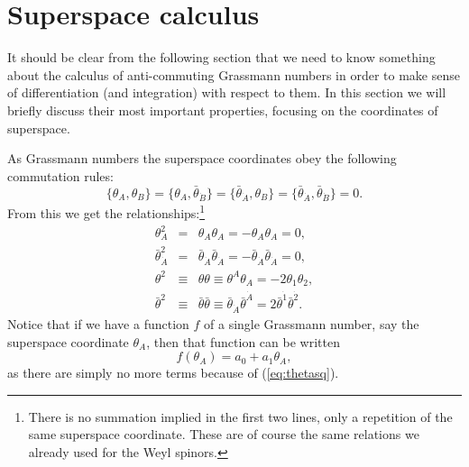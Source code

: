 \documentclass[notes.tex]{subfiles}
\begin{document}
\section{Superspace calculus}
\label{sec:calc}
It should be clear from the following section that we need to know something about the calculus of anti-commuting Grassmann numbers in order to make sense of differentiation (and integration) with respect to them. In this section we will briefly discuss their most important properties, focusing on the coordinates of superspace.

As Grassmann numbers the superspace coordinates obey the following commutation rules:
\[\{\theta_A, \theta_B\} = \{\theta_A, \bar{\theta}_{\dot{B}}\} = \{ \bar{\theta}_{\dot{A}}, \theta_B\} = \{\bar{\theta}_{\dot{A}}, \bar{\theta}_{\dot{B}}\} =0.\]
From this we get the relationships:\footnote{There is no summation implied in the first two lines, only a repetition of the same superspace coordinate. These are of course the same relations we already used for the Weyl spinors.}
\begin{eqnarray}
\theta_A^2 &=& \theta_A \theta_A = -\theta_A \theta_A = 0, \label{eq:thetasq}\\
\bar{\theta}_{\dot{A}}^2 &=& \bar{\theta}_{\dot{A}}\bar{\theta}_{\dot{A}} = -\bar{\theta}_{\dot{A}}\bar{\theta}_{\dot{A}} = 0, \\
\theta^2 &\equiv& \theta\theta \equiv \theta^A\theta_A = -2\theta_1\theta_2,\\
\bar{\theta}^2 &\equiv& \bar{\theta}\bar{\theta} \equiv \bar{\theta}_{\dot{A}}\bar{\theta}^{\dot{A}} = 2\bar{\theta}^{\dot{1}}\bar{\theta}^{\dot{2}}.
\end{eqnarray}
Notice that if we have a function $f$ of a single Grassmann number, say the superspace coordinate $\theta_A$, then that function can be written
\begin{equation}
f(\theta_A) = a_0 + a_1 \theta_A,\label{eq:fexp}
\end{equation}
as there are simply no more terms because of (\ref{eq:thetasq}).
\end{document}
